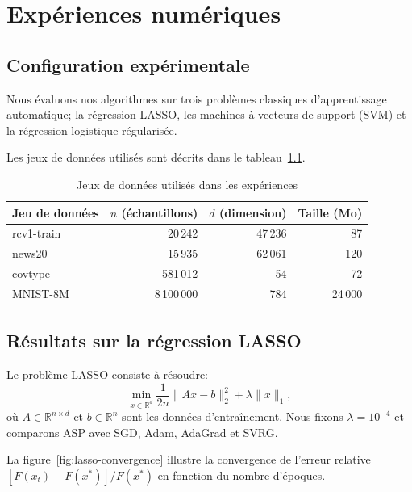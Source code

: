 \documentclass[12pt,a4paper]{report}
\begin{document}
\chapter{Exp\'eriences num\'eriques}

\section{Configuration exp\'erimentale}

Nous \'evaluons nos algorithmes sur trois probl\`emes classiques
d'apprentissage automatique; la r\'egression LASSO, les machines \`a
vecteurs de support (SVM) et la r\'egression logistique r\'egularis\'ee.

Les jeux de donn\'ees utilis\'es sont d\'ecrits dans le
tableau~\ref{tab:datasets}.

\begin{table}[htbp]
\centering
\caption{Jeux de donn\'ees utilis\'es dans les exp\'eriences}\label{tab:datasets}
\begin{tabular}{@{}lrrr@{}}
\toprule
Jeu de donn\'ees & $n$ (\'echantillons) & $d$ (dimension) & Taille (Mo) \\
\midrule
rcv1-train  & 20\,242  & 47\,236  & 87 \\
news20      & 15\,935  & 62\,061  & 120 \\
covtype     & 581\,012 & 54       & 72 \\
MNIST-8M    & 8\,100\,000 & 784   & 24\,000 \\
\bottomrule
\end{tabular}
\end{table}

\section{R\'esultats sur la r\'egression LASSO}

Le probl\`eme LASSO consiste \`a r\'esoudre:
\begin{equation}
  \min_{x \in \mathbb{R}^d} \frac{1}{2n} \|Ax - b\|_2^2 + \lambda \|x\|_1,
\end{equation}
o\`u $A \in \mathbb{R}^{n \times d}$ et $b \in \mathbb{R}^n$ sont les
donn\'ees d'entra\^inement. Nous fixons $\lambda = 10^{-4}$ et comparons
ASP avec SGD, Adam, AdaGrad et SVRG.

La figure~\ref{fig:lasso-convergence} illustre la convergence de l'erreur
relative $[F(x_t) - F(x^*)] / F(x^*)$ en fonction du nombre d'\'epoques.
\end{document}
